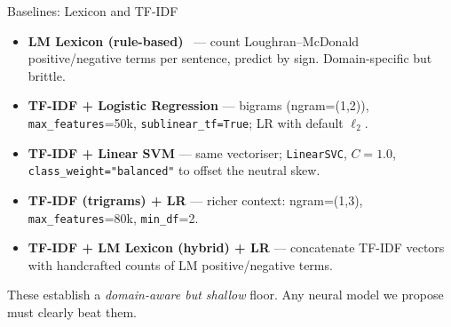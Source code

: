 \documentclass[10pt, aspectratio=169]{beamer}
\begin{document}
\begin{frame}{Baselines: Lexicon and TF-IDF}
    \begin{itemize}\setlength{\itemsep}{0.35em}
        \item \textbf{LM Lexicon (rule-based)}~\cite{loughran2011liability} --- count Loughran--McDonald positive/negative terms per sentence, predict by sign. Domain-specific but brittle.
        \item \textbf{TF-IDF + Logistic Regression} --- bigrams (ngram=(1,2)), \texttt{max\_features}=50k, \texttt{sublinear\_tf=True}; LR with default $\ell_2$.
        \item \textbf{TF-IDF + Linear SVM} --- same vectoriser; \texttt{LinearSVC}, $C{=}1.0$, \texttt{class\_weight="balanced"} to offset the neutral skew.
        \item \textbf{TF-IDF (trigrams) + LR} --- richer context: ngram=(1,3), \texttt{max\_features}=80k, \texttt{min\_df}=2.
        \item \textbf{TF-IDF + LM Lexicon (hybrid) + LR} --- concatenate TF-IDF vectors with handcrafted counts of LM positive/negative terms.
    \end{itemize}

    \vspace{0.3em}
    {\small These establish a \textit{domain-aware but shallow} floor. Any neural model we propose must clearly beat them.}
\end{frame}
\end{document}
